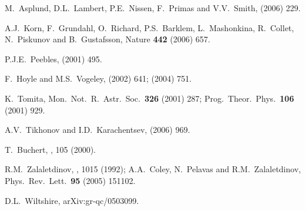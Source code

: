 \documentclass[12pt]{iopart}
\begin{document}
\begin{thebibliography}{66}
M.~Asplund, D.L.~Lambert, P.E.~Nissen, F.~Primas and V.V.~Smith,
 (2006) 229. %

A.J.~Korn, F.~Grundahl, O.~Richard, P.S.~Barklem, L.~Mashonkina, R.~Collet,
N.~Piskunov and B.~Gustafsson,
Nature {\bf442} (2006) 657. %

P.J.E.~Peebles,
 (2001) 495. %

F.~Hoyle and M.S.~Vogeley,
 (2002) 641; %
 (2004) 751. %

K.~Tomita,
Mon.\ Not.\ R.\ Astr.\ Soc.\ {\bf326} (2001) 287; %
Prog.\ Theor.\ Phys.\ {\bf106} (2001) 929. %

A.V.~Tikhonov and I.D.~Karachentsev,
 (2006) 969. %

T.~Buchert,
, 105 (2000). %

R.M.~Zalaletdinov,
, 1015 (1992);
A.A.~Coley, N.~Pelavas and R.M.~Zalaletdinov,
Phys.\ Rev.\ Lett.\ {\bf 95} (2005) 151102.

D.L.~Wiltshire,
arXiv:gr-qc/0503099.


\end{thebibliography}
\end{document}

